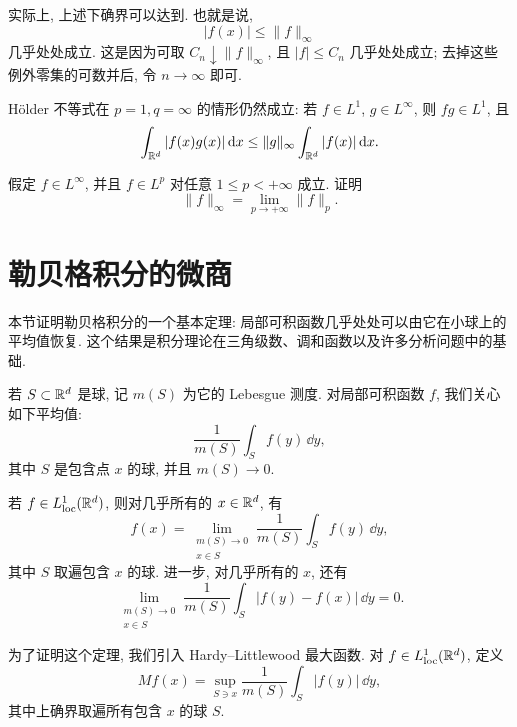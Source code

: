 实际上, 上述下确界可以达到. 也就是说,
\[
|f(x)|\leq \|f\|_\infty
\]
几乎处处成立. 这是因为可取 \(C_n\downarrow \|f\|_\infty\), 且 \(|f|\leq C_n\) 几乎处处成立; 去掉这些例外零集的可数并后, 令 \(n\to\infty\) 即可.

\begin{rem}
	H\"older 不等式在 \(p=1,q=\infty\) 的情形仍然成立: 若 \(f\in L^1\), \(g\in L^\infty\), 则 \(fg\in L^1\), 且
	\[
	\int_{\mathbb{R}^d}|f(x)g(x)|\,\dd x
	\leq
	\|g\|_\infty\int_{\mathbb{R}^d}|f(x)|\,\dd x.
	\]
\end{rem}

\begin{exer}
	\label{exer:lp-limit-to-linfty}
	假定 \(f\in L^\infty\), 并且 \(f\in L^p\) 对任意 \(1\leq p<+\infty\) 成立. 证明
	\[
	\|f\|_\infty
	=
	\lim_{p\to+\infty}\|f\|_p.
	\]
\end{exer}

\clearpage

\section{勒贝格积分的微商}
\label{sec:derivatives-of-lebesgue-integrals}

本节证明勒贝格积分的一个基本定理: 局部可积函数几乎处处可以由它在小球上的平均值恢复. 这个结果是积分理论在三角级数、调和函数以及许多分析问题中的基础.

若 \(S\subset\mathbb{R}^d\) 是球, 记 \(m(S)\) 为它的 Lebesgue 测度. 对局部可积函数 \(f\), 我们关心如下平均值:
\[
\frac{1}{m(S)}\int_S f(y)\,\dd y,
\]
其中 \(S\) 是包含点 \(x\) 的球, 并且 \(m(S)\to0\).

\begin{thm}
	\label{thm:lebesgue-differentiation-balls}
	若 \(f\in L^1_{\operatorname{loc}}(\mathbb{R}^d)\), 则对几乎所有的 \(x\in\mathbb{R}^d\), 有
	\begin{equation}
		f(x)=\lim_{\substack{m(S)\to0\\ x\in S}}
		\frac{1}{m(S)}\int_S f(y)\,\dd y,
		\label{eq:lebesgue-differentiation-average}
	\end{equation}
	其中 \(S\) 取遍包含 \(x\) 的球. 进一步, 对几乎所有的 \(x\), 还有
	\begin{equation}
		\lim_{\substack{m(S)\to0\\ x\in S}}
		\frac{1}{m(S)}\int_S |f(y)-f(x)|\,\dd y=0.
		\label{eq:lebesgue-point-property}
	\end{equation}
\end{thm}

为了证明这个定理, 我们引入 Hardy--Littlewood 最大函数. 对 \(f\in L^1_{\operatorname{loc}}(\mathbb{R}^d)\), 定义
\begin{equation}
	Mf(x)=\sup_{S\ni x}\frac{1}{m(S)}\int_S |f(y)|\,\dd y,
	\label{eq:hardy-littlewood-maximal-function}
\end{equation}
其中上确界取遍所有包含 \(x\) 的球 \(S\).


